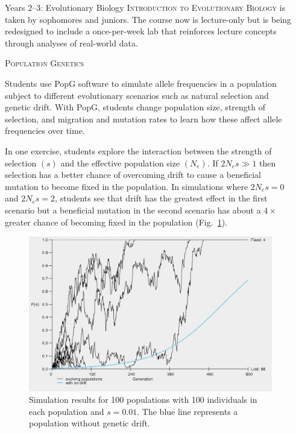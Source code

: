 \documentclass[final,hyperref={pdfpagelabels=false}]{beamer}
\newcommand{\whitespace}{\vspace{0.5\baselineskip}}
\newlength{\sepwid}
\newlength{\onecolwid}
\begin{document}
\begin{frame}[t]
\begin{columns}[t]
	\begin{column}{\sepwid}
	\end{column}

	\begin{column}{\onecolwid}
    	\begin{block}{Years 2–3: Evolutionary Biology}
       		\textsc{Introduction to Evolutionary Biology} is taken by sophomores and juniors. The course now is lecture-only but is being redesigned to include a once-per-week lab that reinforces lecture concepts through analyses of real-world data.
       		
       		\whitespace
       		
       		\textcolor{cardiac}{\textsc{Population Genetics}}
       		
       		Students use PopG software \citep{Felsenstein2016:popg} to simulate allele frequencies in a population subject to different evolutionary scenarios such as natural selection and genetic drift. With PopG, students change population size, strength of selection, and migration and mutation rates to learn how these affect allele frequencies over time.
       		
       		\whitespace
       		
       		In one exercise, students explore the interaction between the strength of selection $\left(s\right)$ and the effective population size $\left(N_e\right)$. 
       		If $2N_es \gg 1$ then selection has a better chance of overcoming drift to cause a beneficial mutation to become fixed in the population. In  simulations where $2N_es = 0$ and $2N_es = 2$, students see that drift has the greatest effect in the first scenario but a beneficial mutation in the second scenario has about a $4\times$ greater chance of becoming fixed in the population (Fig.~\ref{fig:simulation}). 
       		
       		\vspace*{0.5\baselineskip}
       		
			\begin{figure}
			\includegraphics[width=\textwidth]{ns_graph}
			\caption{Simulation results for 100 populations with 100 individuals in each population and $s = 0.01$. The blue line represents a population without genetic drift.\label{fig:simulation}}
			\end{figure}
       		

\end{block}
\end{column}
\end{columns}
\end{frame}
\end{document}
